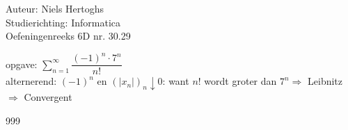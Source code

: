 \documentclass[a4paper]{article}
\begin{document}
  
\noindent \large Auteur: Niels Hertoghs\\
\noindent \large Studierichting: Informatica\\
\noindent \large Oefeningenreeks 6D nr. 30.29\\

\medskip

\normalsize

opgave: $\displaystyle\sum_{n = 1}^{\infty} \dfrac{(-1)^n \cdot 7^n}{n!}$\\

alternerend: $(-1)^n$ en $(|x_n|)_n \downarrow 0$: want $n!$ wordt groter dan $7^n \Rightarrow$ Leibnitz\\

$\Rightarrow$ Convergent

\begin{thebibliography}{999}
\end{thebibliography}
\end{document}
